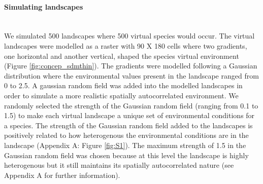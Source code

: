 \paragraph*{Simulating landscapes}\mbox{}\\ 
We simulated 500 landscapes where 500 virtual species would occur. The virtual landscapes were modelled as a raster with 90 X 180 cells where two gradients, one horizontal and another vertical, shaped the species virtual environment (Figure \ref{fig:concep_sdmthin}). The gradients were modelled following a Gaussian distribution \parencite{dallas2020} where the environmental values present in the landscape ranged from 0 to 2.5. A gaussian random field was added into the modelled landscapes in order to simulate a more realistic spatially autocorrelated environment. We randomly selected the strength of the Gaussian random field (ranging from 0.1 to 1.5) to make each virtual landscape a unique set of environmental conditions for a species. The strength of the Gaussian random field added to the landscapes is positively related to how heterogenous the environmental conditions are in the landscape (Appendix A: Figure \ref{fig:S1}). The maximum strength of 1.5 in the Gaussian random field was chosen because at this level the landscape is highly heterogenous but it still maintains its spatially autocorrelated nature (see Appendix A for further information).


